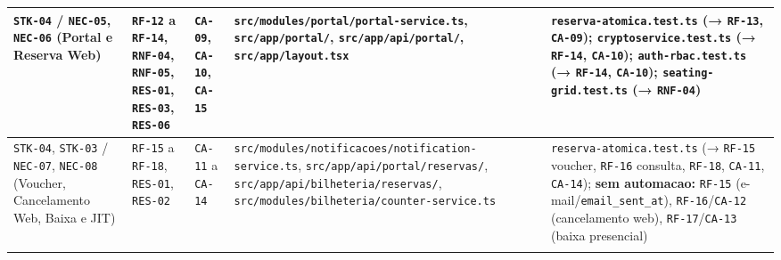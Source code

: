 \begin{center}
\begin{tabularx}{\textwidth}{>{\raggedright\arraybackslash}m{2.6cm} >{\raggedright\arraybackslash}m{1.7cm} >{\raggedright\arraybackslash}m{1.3cm} >{\raggedright\arraybackslash}m{4.0cm} Y}
\midrule
\texttt{STK-04} / \texttt{NEC-05}, \texttt{NEC-06} (Portal e Reserva Web) & \texttt{RF-12} a \texttt{RF-14}, \texttt{RNF-04}, \texttt{RNF-05}, \texttt{RES-01}, \texttt{RES-03}, \texttt{RES-06} & \texttt{CA-09}, \texttt{CA-10}, \texttt{CA-15} & \texttt{src/modules/portal/portal-service.ts}, \texttt{src/app/portal/}, \texttt{src/app/api/portal/}, \texttt{src/app/layout.tsx} & \texttt{reserva-atomica.test.ts} (→ \texttt{RF-13}, \texttt{CA-09}); \texttt{cryptoservice.test.ts} (→ \texttt{RF-14}, \texttt{CA-10}); \texttt{auth-rbac.test.ts} (→ \texttt{RF-14}, \texttt{CA-10}); \texttt{seating-grid.test.ts} (→ \texttt{RNF-04}) \\
\midrule
\texttt{STK-04}, \texttt{STK-03} / \texttt{NEC-07}, \texttt{NEC-08} (Voucher, Cancelamento Web, Baixa e JIT) & \texttt{RF-15} a \texttt{RF-18}, \texttt{RES-01}, \texttt{RES-02} & \texttt{CA-11} a \texttt{CA-14} & \texttt{src/modules/notificacoes/notification-service.ts}, \texttt{src/app/api/portal/reservas/}, \texttt{src/app/api/bilheteria/reservas/}, \texttt{src/modules/bilheteria/counter-service.ts} & \texttt{reserva-atomica.test.ts} (→ \texttt{RF-15} voucher, \texttt{RF-16} consulta, \texttt{RF-18}, \texttt{CA-11}, \texttt{CA-14}); \textbf{sem automacao:} \texttt{RF-15} (e-mail/\texttt{email\_sent\_at}), \texttt{RF-16}/\texttt{CA-12} (cancelamento web), \texttt{RF-17}/\texttt{CA-13} (baixa presencial) \\
\bottomrule
\end{tabularx}
\end{center}
